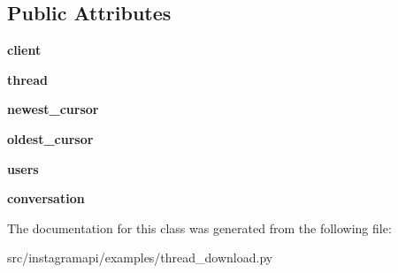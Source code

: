 \subsection*{Public Attributes}
\begin{DoxyCompactItemize}
\item 
\mbox{\label{classexamples_1_1thread__download_1_1_download_thread_a683875cdba1627a9fa57b4de5256629d}} 
{\bfseries client}
\item 
\mbox{\label{classexamples_1_1thread__download_1_1_download_thread_a353134ad1fdff6ff153900f3e7aea285}} 
{\bfseries thread}
\item 
\mbox{\label{classexamples_1_1thread__download_1_1_download_thread_abd7635cec369f4cf989e0791802d7487}} 
{\bfseries newest\+\_\+cursor}
\item 
\mbox{\label{classexamples_1_1thread__download_1_1_download_thread_a1f27cc8a418731a02cd467755cc38c06}} 
{\bfseries oldest\+\_\+cursor}
\item 
\mbox{\label{classexamples_1_1thread__download_1_1_download_thread_a2d5309a74ee31712854c6cd5e16fade7}} 
{\bfseries users}
\item 
\mbox{\label{classexamples_1_1thread__download_1_1_download_thread_a1991d8ddd8bc9abc54582d19a944bc76}} 
{\bfseries conversation}
\end{DoxyCompactItemize}


The documentation for this class was generated from the following file\+:\begin{DoxyCompactItemize}
\item 
src/instagramapi/examples/thread\+\_\+download.\+py\end{DoxyCompactItemize}
